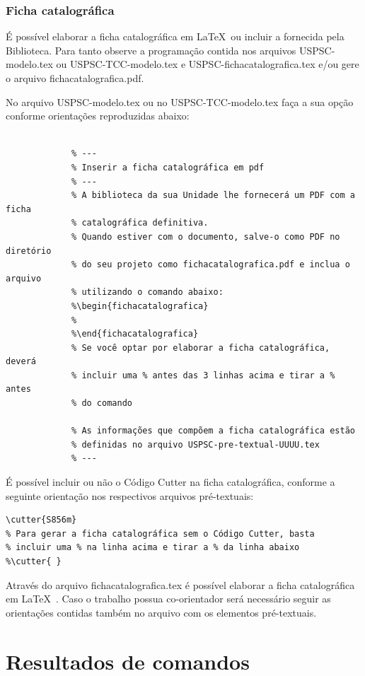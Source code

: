 \subsubsection{Ficha catalográfica}
É possível elaborar a ficha catalográfica em \LaTeX\ ou incluir a fornecida pela Biblioteca. Para tanto observe a programação contida nos arquivos USPSC-modelo.tex ou USPSC-TCC-modelo.tex  e USPSC-fichacatalografica.tex e/ou gere o arquivo fichacatalografica.pdf.
	  
No arquivo USPSC-modelo.tex ou no USPSC-TCC-modelo.tex faça a sua opção conforme orientações reproduzidas abaixo:

			 \begin{verbatim}
			 
			 % ---
			 % Inserir a ficha catalográfica em pdf
			 % ---
			 % A biblioteca da sua Unidade lhe fornecerá um PDF com a ficha
			 % catalográfica definitiva. 
			 % Quando estiver com o documento, salve-o como PDF no diretório
			 % do seu projeto como fichacatalografica.pdf e inclua o arquivo
			 % utilizando o comando abaixo:
			 %\begin{fichacatalografica}
			 %   
			 %\end{fichacatalografica}
			 % Se você optar por elaborar a ficha catalográfica, deverá 
			 % incluir uma % antes das 3 linhas acima e tirar a % antes
			 % do comando 
			 
			 % As informações que compõem a ficha catalográfica estão 
			 % definidas no arquivo USPSC-pre-textual-UUUU.tex
			 % ---
			 \end{verbatim} 
			 				
É possível incluir ou não o Código Cutter na ficha catalográfica, conforme a seguinte orientação nos respectivos arquivos pré-textuais:

\begin{verbatim}
\cutter{S856m}
% Para gerar a ficha catalográfica sem o Código Cutter, basta 
% incluir uma % na linha acima e tirar a % da linha abaixo
%\cutter{ } 
\end{verbatim} 

Através do arquivo fichacatalografica.tex é possível elaborar a ficha catalográfica em \LaTeX\ . Caso o trabalho possua co-orientador será necessário seguir as orientações contidas também no arquivo com os elementos pré-textuais.	 


\section{Resultados de comandos}\label{sec-divisoes}

